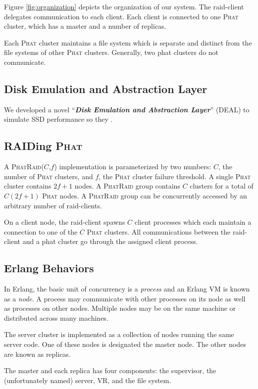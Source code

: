 \documentclass[10pt,letter]{article}
\newcommand{\phat}[0]{\textsc{Phat}}
\newcommand{\phatraid}[0]{\textsc{PhatRaid}}
\newcommand{\phatraidcf}[2]{\textsc{PhatRaid}(#1,#2)}
\begin{document}
Figure \ref{fig:organization} depicts the organization of our system. The
raid-client delegates communication to each client. Each client is connected to
one \phat{} cluster, which has a master and a number of replicas.

Each \phat{} cluster maintains a file system which is separate and distinct from
the file systems of other \phat{} clusters. Generally, two phat clusters do not
communicate.

\subsection{Disk Emulation and Abstraction Layer}

We developed a novel ``{\bf {\em Disk Emulation and Abstraction Layer}}'' (DEAL) to simulate SSD performance so they . 

\subsection{RAIDing \phat{}}

A \phatraidcf{$C$}{$f$} implementation is parameterized by two numbers: $C$, the
number of \phat{} clusters, and $f$, the \phat{} cluster failure threshold. A
single \phat{} cluster contains $2f + 1$ nodes. A \phatraid{} group contains $C$
clusters for a total of $C(2f+1)$ \phat{} nodes. A \phatraid{} group can be
concurrently accessed by an arbitrary number of raid-clients.

On a client node, the raid-client spawns $C$ client processes which each maintain
a connection to one of the $C$ \phat{} clusters. All communications between the
raid-client and a phat cluster go through the assigned client process.

\subsection{Erlang Behaviors}

In Erlang, the basic unit of concurrency is a \emph{process} and an Erlang VM is
known as a \emph{node}. A process may communicate with other processes on its
node as well as processes on other nodes. Multiple nodes may be on the same
machine or distributed across many machines.

The server cluster is implemented as a collection of nodes running the same
server code. One of these nodes is designated the master node. The other nodes
are known as replicas.

The master and each replica has four components: the supervisor, the
(unfortunately named) server, VR, and the file system.
\end{document}
